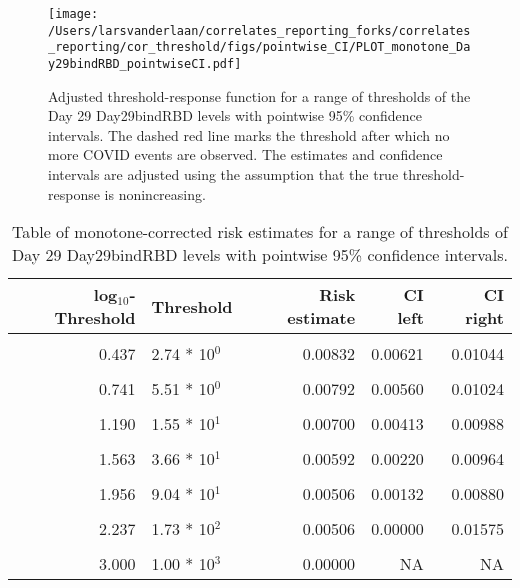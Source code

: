 \documentclass[]{article}
\begin{document}
\begin{figure}[H]
\centering
\texttt{[image: /Users/larsvanderlaan/correlates\_reporting\_forks/correlates\_reporting/cor\_threshold/figs/pointwise\_CI/PLOT\_monotone\_Day29bindRBD\_pointwiseCI.pdf]}
\caption{Adjusted threshold-response function for a range of thresholds of the
  Day 29 Day29bindRBD levels with pointwise 95\% confidence intervals. The dashed red line marks the threshold after which no more COVID events are observed. The estimates and confidence intervals are adjusted using the assumption that the true threshold-response is nonincreasing.}
\end{figure}
\begin{table}[!h]

\caption{\label{tab:unnamed-chunk-20}Table of monotone-corrected risk estimates for a range of thresholds of Day 29 Day29bindRBD levels with pointwise 95\% confidence intervals.}
\centering
\begin{tabular}[t]{rlrrr}
\toprule
log$_{10}$-Threshold & Threshold & Risk estimate & CI left & CI right\\
\midrule
\cellcolor{gray!6}{-0.099} & \cellcolor{gray!6}{7.96 * 10$^{1}$} & \cellcolor{gray!6}{0.00856} & \cellcolor{gray!6}{0.00655} & \cellcolor{gray!6}{0.01057}\\
0.437 & 2.74 * 10$^{0}$ & 0.00832 & 0.00621 & 0.01044\\
\cellcolor{gray!6}{0.585} & \cellcolor{gray!6}{3.85 * 10$^{0}$} & \cellcolor{gray!6}{0.00832} & \cellcolor{gray!6}{0.00607} & \cellcolor{gray!6}{0.01057}\\
0.741 & 5.51 * 10$^{0}$ & 0.00792 & 0.00560 & 0.01024\\
\cellcolor{gray!6}{1.000} & \cellcolor{gray!6}{1.00 * 10$^{1}$} & \cellcolor{gray!6}{0.00756} & \cellcolor{gray!6}{0.00515} & \cellcolor{gray!6}{0.00997}\\
1.190 & 1.55 * 10$^{1}$ & 0.00700 & 0.00413 & 0.00988\\
\cellcolor{gray!6}{1.371} & \cellcolor{gray!6}{2.35 * 10$^{1}$} & \cellcolor{gray!6}{0.00636} & \cellcolor{gray!6}{0.00315} & \cellcolor{gray!6}{0.00956}\\
1.563 & 3.66 * 10$^{1}$ & 0.00592 & 0.00220 & 0.00964\\
\cellcolor{gray!6}{1.852} & \cellcolor{gray!6}{7.11 * 10$^{1}$} & \cellcolor{gray!6}{0.00587} & \cellcolor{gray!6}{0.00158} & \cellcolor{gray!6}{0.01016}\\
1.956 & 9.04 * 10$^{1}$ & 0.00506 & 0.00132 & 0.00880\\
\cellcolor{gray!6}{2.083} & \cellcolor{gray!6}{1.21 * 10$^{2}$} & \cellcolor{gray!6}{0.00506} & \cellcolor{gray!6}{0.00000} & \cellcolor{gray!6}{0.01575}\\
2.237 & 1.73 * 10$^{2}$ & 0.00506 & 0.00000 & 0.01575\\
\cellcolor{gray!6}{2.699} & \cellcolor{gray!6}{5.00 * 10$^{2}$} & \cellcolor{gray!6}{0.00000} & \cellcolor{gray!6}{NA} & \cellcolor{gray!6}{NA}\\
3.000 & 1.00 * 10$^{3}$ & 0.00000 & NA & NA\\
\bottomrule
\end{tabular}
\end{table}
\end{document}
